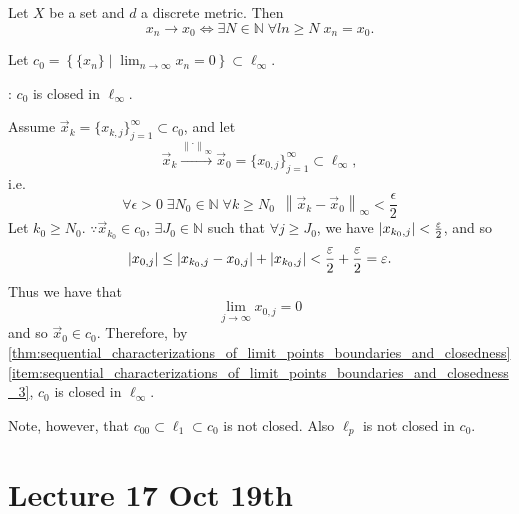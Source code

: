 \documentclass[notoc,notitlepage]{tufte-book}
\newcommand{\norm}[1]{\left\| #1 \right\|}
\begin{document}
\begin{eg}
  Let $X$ be a set and $d$ a discrete metric. Then
  \begin{equation*}
    x_n \to x_0 \iff \exists N \in \mathbb{N} \; \forall ln \geq N \; x_n = x_0.
  \end{equation*}
\end{eg}

\begin{eg}
  Let $c_0 = \left\{ \{ x_n \} \mid \lim_{n \to \infty} x_n = 0 \right\} \subset \ell_\infty$.

  \noindent{} : $c_0$ is closed in $\ell_\infty$.

  Assume $\vec{x}_k = \{ x_{k, j} \}_{j = 1}^{\infty} \subset c_0$, and let
  \begin{equation*}
    \vec{x}_k \overset{\norm\cdot_\infty}{\to} \vec{x}_0 = \{ x_{0, j} \}_{j = 1}^{\infty} \subset \ell_\infty,
  \end{equation*}
  i.e.
  \begin{equation*}
    \forall \epsilon > 0 \; \exists N_0 \in \mathbb{N} \; \forall k \geq N_0 \enspace \norm{ \vec{x}_k - \vec{x}_0 }_\infty < \frac{\epsilon}{2}
  \end{equation*}
  Let $k_0 \geq N_0$. $\because \vec{x}_{k_0} \in c_0$, $\exists J_0 \in \mathbb{N}$ such that $\forall j \geq J_0$, we have $\left| x_{k_0, j} \right| < \frac{\varepsilon}{2}$, and so
  \begin{equation*}
    \left|x_{0, j}\right| \leq \left| x_{k_0, j} - x_{0, j} \right| + \left| x_{k_0, j} \right| < \frac{\varepsilon}{2} + \frac{\varepsilon}{2} = \varepsilon.
  \end{equation*}
  Thus we have that
  \begin{equation*}
    \lim_{j \to \infty} x_{0, j} = 0
  \end{equation*}
  and so $\vec{x}_0 \in c_0$. Therefore, by \cref{thm:sequential_characterizations_of_limit_points_boundaries_and_closedness} \cref{item:sequential_characterizations_of_limit_points_boundaries_and_closedness_3}, $c_0$ is closed in $\ell_\infty$.
\end{eg}

Note, however, that $c_{00} \subset \ell_1 \subset c_0$ is not closed. Also $\ell_p$ is not closed in $c_0$.



\chapter{Lecture 17 Oct 19th}%
\label{chp:lecture_17_oct_19th}
\end{document}
